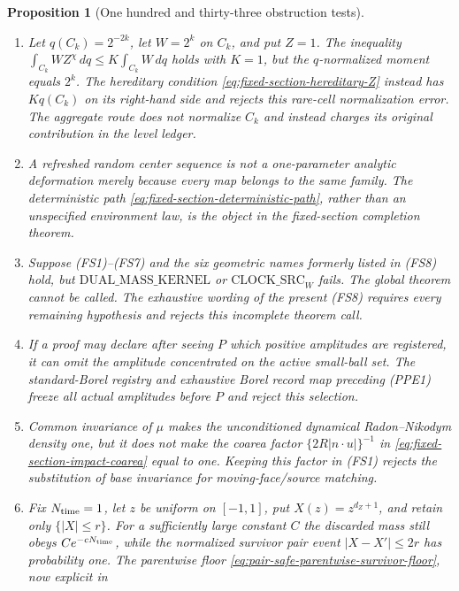 \documentclass[11pt]{article}
\newtheorem{proposition}[theorem]{Proposition}
\begin{document}
\begin{proposition}[One hundred and thirty-three obstruction tests]
\begin{enumerate}[label=\textup{(T\arabic*)}]
      finite enumeration alone is not a proof of $\mathrm{PPE}_{N}$.
\item Let $q(C_k)=2^{-2k}$, let $W=2^k$ on $C_k$, and put $Z=1$.
      The inequality
      $\int_{C_k}WZ^\chi\,dq\le K\int_{C_k}W\,dq$ holds with $K=1$,
      but the $q$-normalized moment equals $2^k$.  The hereditary condition
      \eqref{eq:fixed-section-hereditary-Z} instead has $Kq(C_k)$ on its
      right-hand side and rejects this rare-cell normalization error.  The
      aggregate route does not normalize $C_k$ and instead charges its
      original contribution in the level ledger.
\item A refreshed random center sequence is not a one-parameter analytic
      deformation merely because every map belongs to the same family.
      The deterministic path \eqref{eq:fixed-section-deterministic-path},
      rather than an unspecified environment law, is the object in the
      fixed-section completion theorem.
\item Suppose \textup{(FS1)--(FS7)} and the six geometric names formerly
      listed in \textup{(FS8)} hold, but
      $\mathrm{DUAL\_MASS\_KERNEL}$ or
      $\mathrm{CLOCK\_SRC}_{W}$ fails.  The global theorem cannot be called.
      The exhaustive wording of the present \textup{(FS8)} requires every
      remaining hypothesis and rejects this incomplete theorem call.
\item If a proof may declare after seeing $P$ which positive amplitudes are
      registered, it can omit the amplitude concentrated on the active
      small-ball set.  The standard-Borel registry and exhaustive Borel
      record map preceding \textup{(PPE1)} freeze all actual amplitudes
      before $P$ and reject this selection.
\item Common invariance of $\mu$ makes the unconditioned dynamical
      Radon--Nikodym density one, but it does not make the coarea factor
      $\{2R|n\cdot u|\}^{-1}$ in
      \eqref{eq:fixed-section-impact-coarea} equal to one.  Keeping this
      factor in \textup{(FS1)} rejects the substitution of base invariance
      for moving-face/source matching.
\item Fix $N_{\rm time}=1$, let $z$ be uniform on $[-1,1]$, put
      $X(z)=z^{d_Z+1}$, and retain only $\{|X|\le r\}$.  For a sufficiently
      large constant $C$ the discarded mass still obeys
      $Ce^{-cN_{\rm time}}$, while the normalized survivor pair event
      $|X-X'|\le2r$ has probability one.  The parentwise floor
      \eqref{eq:pair-safe-parentwise-survivor-floor}, now explicit in

\end{enumerate}
\end{proposition}
\end{document}
